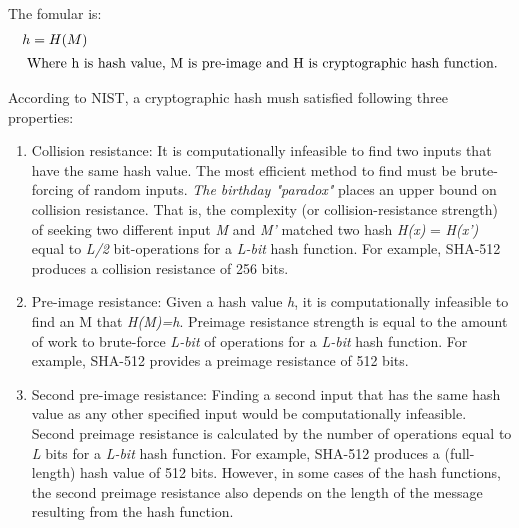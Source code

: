 The fomular is:
\begin{align*}
  h & = H(M) \\ \intertext{ Where h is hash value, M is pre-image and H is cryptographic hash function.}
\end{align*}


According to NIST, a cryptographic hash mush satisfied following three properties:
\begin{enumerate}
  \item Collision resistance: It is computationally infeasible to find two inputs that have the same hash value.
        The most efficient method to find must be brute-forcing of random inputs.
        \emph{The birthday "paradox"} places an upper bound on collision resistance.
        That is, the complexity (or collision-resistance strength) of seeking two different input \emph{M} and \emph{M'} matched two hash \emph{H(x)} = \emph{H(x’)} equal to \emph{L/2} bit-operations for a \emph{L-bit} hash function.
        For example, SHA-512 produces a collision resistance of 256 bits.

  \item Pre-image resistance: Given a hash value \emph{h}, it is computationally infeasible to find an M that \emph{H(M)=h}.
        Preimage resistance strength is equal to the amount of work to brute-force \emph{L-bit} of operations for a \emph{L-bit} hash function.
        For example, SHA-512 provides a preimage resistance of 512 bits.

  \item Second pre-image resistance: Finding a second input that has the same hash value as any other specified input would be computationally infeasible.
        Second preimage resistance is calculated by the number of operations equal to  \emph{L} bits for a \emph{L-bit} hash function.
        For example, SHA-512 produces a (full-length) hash value of 512 bits.
        However, in some cases of the hash functions, the second preimage resistance also depends on the length of the message resulting from the hash function.

\end{enumerate}

